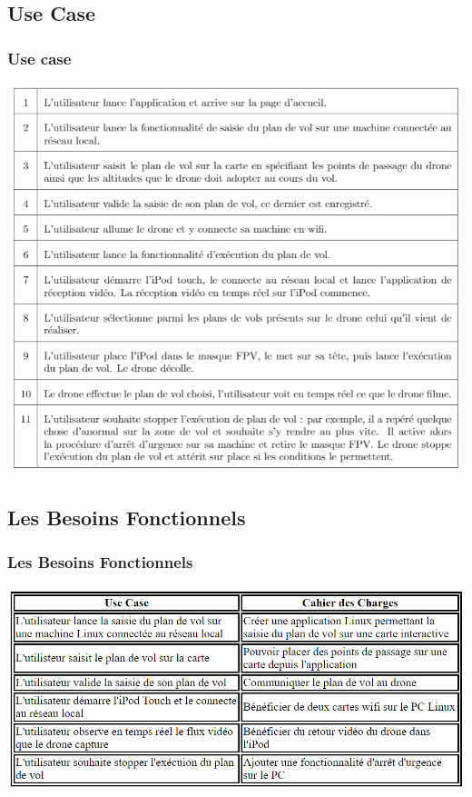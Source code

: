 \documentclass{beamer}
\begin{document}
	\begin{frame}
	\section{Use Case}
		\begin{center}
		\frametitle{Use case}
        \includegraphics[scale=0.5]{Use_Case.PNG}
       \end{center}
	\end{frame}
	\begin{frame}
	\section{Les Besoins Fonctionnels}
		\begin{center}
		\frametitle{Les Besoins Fonctionnels}
		\includegraphics[scale=0.65]{use_charges.png}
		\end{center}
	\end{frame}
\end{document}
